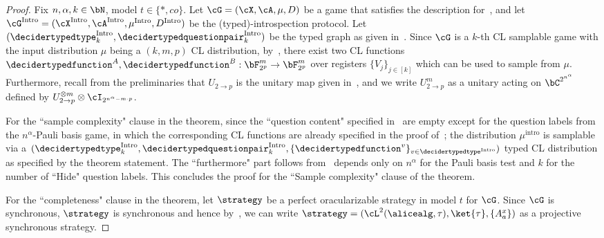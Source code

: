 \begin{proof}
	Fix $n, \alpha, k  \in \bN$, model  $t \in \{*, co\}$. Let $\cG = (\cX, \cA, \mu,D)$ be a game that satisfies the description for~, and let $\cG^{\text{Intro}} = (\cX^{\text{Intro}} , \cA^{\text{Intro}} , \mu^{\text{Intro}} ,D^{\text{Intro}} )$ be the (typed)-introspection protocol. Let $(\decidertypedtype^{\text{Intro}}_k, \decidertypedquestionpair^{\text{Intro}}_k)$ be the typed graph as given in~. Since $\cG$ is a $k$-th CL samplable game with the input distribution $\mu$ being a $(k,m,p)$ CL distribution, by~, there exist two CL functions $\decidertypedfunction^{A}, \decidertypedfunction^{B}: \bF_{2^p}^m \rightarrow \bF_{2^p}^m$ over registers $\{V_j\}_{j \in [k]}$ which can be used to sample from $\mu$. Furthermore, recall from the preliminaries that $U_{2 \rightarrow p}$ is the unitary map given in~, and we write $U_{2 \rightarrow p}^m$ as a unitary acting on $\bC^{2^{n^{\alpha}}}$ defined by $U_{2 \rightarrow p}^{\otimes m} \otimes \cI_{2^{n^{\alpha} - m \cdot p}}$.
	
	
	For the ``sample complexity" clause in the theorem, since the ``question content" specified in~ are empty except for the question labels from the $n^{\alpha}$-Pauli basis game, in which the corresponding CL functions are already specified in the proof of~; the distribution $\mu^{\text{intro}}$ is samplable via a $(\decidertypedtype^{\text{Intro}}_k, \decidertypedquestionpair^{\text{Intro}}_k, \{\decidertypedfunction^{v}\}_{v \in \decidertypedtype^{\text{Intro}}} )$ typed CL distribution as specified by the theorem statement. The ``furthermore" part follows from~ depends only on $n^{\alpha}$ for the Pauli basis test and $k$ for the number of ``Hide" question labels. This concludes the proof for the ``Sample complexity" clause of the theorem. 
	
	
	For the ``completeness" clause in the theorem, let $\strategy$ be a perfect oracularizable strategy in model $t$ for $\cG$. Since $\cG$ is synchronous, $\strategy$ is synchronous and hence by~, we can write $\strategy = (\cL^2(\alicealg, \tau), \ket{\tau}, \{A_a^x \})$ as a projective synchronous strategy.
	

\end{proof}
